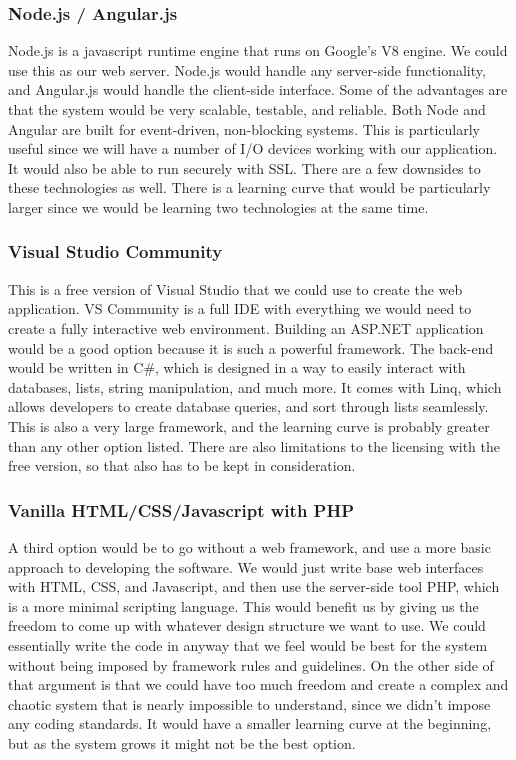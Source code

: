 \documentclass[10pt, onecolumn, twoside, peerreview]{IEEEtran}
\begin{document}
\subsubsection{Node.js / Angular.js}
Node.js is a javascript runtime engine that runs on Google's V8 engine. We could use this as our web server. Node.js
would handle any server-side functionality, and Angular.js would handle the client-side interface. Some of the
advantages are that the system would be very scalable, testable, and reliable. Both Node and Angular are built for
event-driven, non-blocking systems. This is particularly useful since we will have a number of I/O devices working with
our application. It would also be able to run securely with SSL. There are a few downsides to these technologies as
well. There is a learning curve that would be particularly larger since we would be learning two technologies at the
same time.\\

\subsubsection{Visual Studio Community} This is a free version of Visual Studio that we could use to create the web
application. VS Community is a full IDE with everything we would need to create a fully interactive web environment.
Building an ASP.NET application would be a good option because it is such a powerful framework. The back-end would be
written in C\#, which is designed in a way to easily interact with databases, lists, string manipulation, and much
more. It comes with Linq, which allows developers to create database queries, and sort through lists seamlessly. This
is also a very large framework, and the learning curve is probably greater than any other option listed. There are also
limitations to the licensing with the free version, so that also has to be kept in consideration.\\

\subsubsection{Vanilla HTML/CSS/Javascript with PHP}
A third option would be to go without a web framework, and use a more basic approach to developing the software. We
would just write base web interfaces with HTML, CSS, and Javascript, and then use the server-side tool PHP, which is a
more minimal scripting language. This would benefit us by giving us the freedom to come up with whatever design
structure we want to use. We could essentially write the code in anyway that we feel would be best for the system
without being imposed by framework rules and guidelines. On the other side of that argument is that we could have too
much freedom and create a complex and chaotic system that is nearly impossible to understand, since we didn't impose
any coding standards. It would have a smaller learning curve at the beginning, but as the system grows it might not be
the best option.\\
\end{document}
